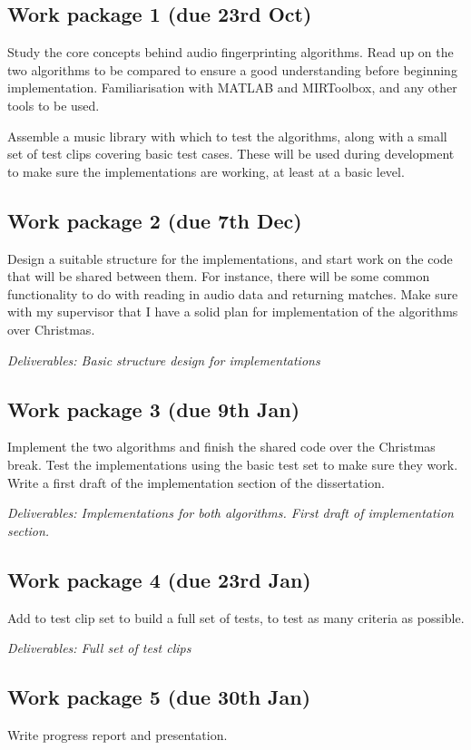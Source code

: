\documentclass[12pt]{article}
\begin{document}
\subsection*{Work package 1 (due 23rd Oct)}
Study the core concepts behind audio fingerprinting algorithms. Read up on the two algorithms to be compared to ensure a good understanding before beginning implementation. Familiarisation with MATLAB and MIRToolbox, and any other tools to be used.

Assemble a music library with which to test the algorithms, along with a small set of test clips covering basic test cases. These will be used during development to make sure the implementations are working, at least at a basic level.

\subsection*{Work package 2 (due 7th Dec)}
Design a suitable structure for the implementations, and start work on the code that will be shared between them. For instance, there will be some common functionality to do with reading in audio data and returning matches. Make sure with my supervisor that I have a solid plan for implementation of the algorithms over Christmas.

\emph{Deliverables: Basic structure design for implementations}

\subsection*{Work package 3 (due 9th Jan)}
Implement the two algorithms and finish the shared code over the Christmas break. Test the implementations using the basic test set to make sure they work. Write a first draft of the implementation section of the dissertation.

\emph{Deliverables: Implementations for both algorithms. First draft of implementation section.}

\subsection*{Work package 4 (due 23rd Jan)}
Add to test clip set to build a full set of tests, to test as many criteria as possible.

\emph{Deliverables: Full set of test clips}

\subsection*{Work package 5 (due 30th Jan)}
Write progress report and presentation.
\end{document}
